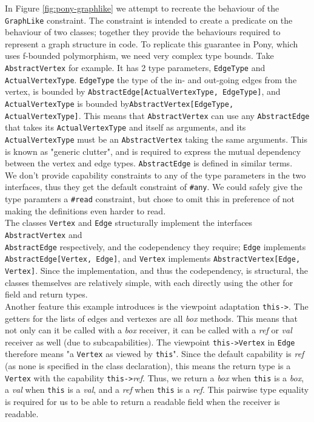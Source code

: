 In Figure \ref{fig:pony-graphlike} we attempt to recreate the behaviour of the \texttt{GraphLike} constraint. The constraint is intended to create a predicate on the behaviour of two classes; together they provide the behaviours required to represent a graph structure in code. To replicate this guarantee in Pony, which uses f-bounded polymorphism, we need very complex type bounds. Take \texttt{AbstractVertex} for example. It has 2 type parameters, \texttt{EdgeType} and \texttt{ActualVertexType}. \texttt{EdgeType} the type of the in- and out-going edges from the vertex, is bounded by \texttt{AbstractEdge[ActualVertexType, EdgeType]}, and \texttt{ActualVertexType} is bounded by\texttt{AbstractVertex[EdgeType,} \\ \texttt{ActualVertexType]}. This means that \texttt{AbstractVertex} can use any \texttt{AbstractEdge} that takes its \texttt{ActualVertexType} and itself as arguments, and its \texttt{ActualVertexType} must be an \texttt{AbstractVertex} taking the same arguments. This is known as "generic clutter", and is required to express the mutual dependency between the vertex and edge types. \texttt{AbstractEdge} is defined in similar terms. \\

We don't provide capability constraints to any of the type parameters in the two interfaces, thus they get the default constraint of \texttt{\#any}. We could safely give the type paramters a \texttt{\#read} constraint, but chose to omit this in preference of not making the definitions even harder to read. \\

The classes \texttt{Vertex} and \texttt{Edge} structurally implement the interfaces \texttt{AbstractVertex} and \\ \texttt{AbstractEdge} respectively, and the codependency they require; \texttt{Edge} implements \\ \texttt{AbstractEdge[Vertex, Edge]}, and \texttt{Vertex} implements \texttt{AbstractVertex[Edge, Vertex]}. Since the implementation, and thus the codependency, is structural, the classes themselves are relatively simple, with each directly using the other for field and return types. \\

Another feature this example introduces is the viewpoint adaptation \texttt{this->}. The getters for the lists of edges and vertexes are all \textit{box} methods. This means that not only can it be called with a \textit{box} receiver, it can be called with a \textit{ref} or \textit{val} receiver as well (due to subcapabilities). The viewpoint \texttt{this->Vertex} in \texttt{Edge} therefore means "a \texttt{Vertex} as viewed by \texttt{this}". Since the default capability is \textit{ref} (as none is specified in the class declaration), this means the return type is a \texttt{Vertex} with the capability \texttt{this->}\textit{ref}. Thus, we return a \textit{box} when \texttt{this} is a \textit{box}, a \textit{val} when \texttt{this} is a \textit{val}, and a \textit{ref} when \texttt{this} is a \textit{ref}. This pairwise type equality is required for us to be able to return a readable field when the receiver is readable. \\

